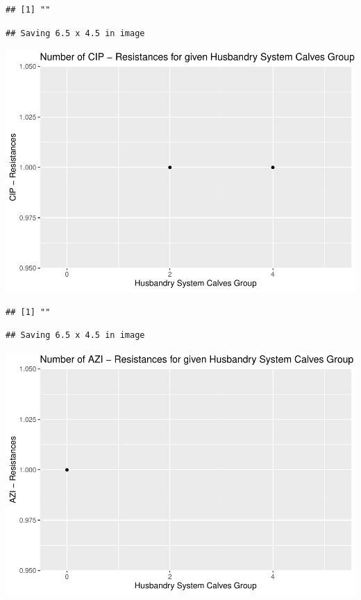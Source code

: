 \documentclass[
]{article}
\begin{document}
\begin{verbatim}
## [1] ""
\end{verbatim}

\begin{verbatim}
## Saving 6.5 x 4.5 in image
\end{verbatim}

\includegraphics{NResistenzen_files/figure-latex/binary_or_nominal_variables-32.pdf}

\begin{verbatim}
## [1] ""
\end{verbatim}

\begin{verbatim}
## Saving 6.5 x 4.5 in image
\end{verbatim}

\includegraphics{NResistenzen_files/figure-latex/binary_or_nominal_variables-33.pdf}
\end{document}
